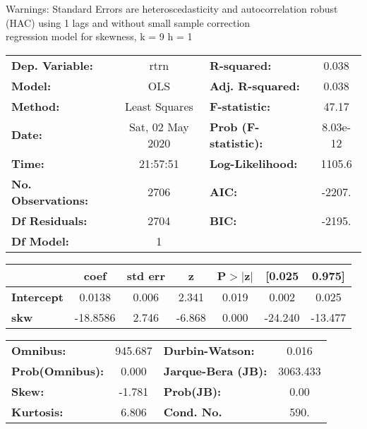 Warnings: \newline
 [1] Standard Errors are heteroscedasticity and autocorrelation robust (HAC) using 1 lags and without small sample correction\\ 

regression model for skewness, k = 9 h = 1\begin{center}
\begin{tabular}{lclc}
\toprule
\textbf{Dep. Variable:}    &       rtrn       & \textbf{  R-squared:         } &     0.038   \\
\textbf{Model:}            &       OLS        & \textbf{  Adj. R-squared:    } &     0.038   \\
\textbf{Method:}           &  Least Squares   & \textbf{  F-statistic:       } &     47.17   \\
\textbf{Date:}             & Sat, 02 May 2020 & \textbf{  Prob (F-statistic):} &  8.03e-12   \\
\textbf{Time:}             &     21:57:51     & \textbf{  Log-Likelihood:    } &    1105.6   \\
\textbf{No. Observations:} &        2706      & \textbf{  AIC:               } &    -2207.   \\
\textbf{Df Residuals:}     &        2704      & \textbf{  BIC:               } &    -2195.   \\
\textbf{Df Model:}         &           1      & \textbf{                     } &             \\
\bottomrule
\end{tabular}
\begin{tabular}{lcccccc}
                   & \textbf{coef} & \textbf{std err} & \textbf{z} & \textbf{P$> |$z$|$} & \textbf{[0.025} & \textbf{0.975]}  \\
\midrule
\textbf{Intercept} &       0.0138  &        0.006     &     2.341  &         0.019        &        0.002    &        0.025     \\
\textbf{skw}       &     -18.8586  &        2.746     &    -6.868  &         0.000        &      -24.240    &      -13.477     \\
\bottomrule
\end{tabular}
\begin{tabular}{lclc}
\textbf{Omnibus:}       & 945.687 & \textbf{  Durbin-Watson:     } &    0.016  \\
\textbf{Prob(Omnibus):} &   0.000 & \textbf{  Jarque-Bera (JB):  } & 3063.433  \\
\textbf{Skew:}          &  -1.781 & \textbf{  Prob(JB):          } &     0.00  \\
\textbf{Kurtosis:}      &   6.806 & \textbf{  Cond. No.          } &     590.  \\
\bottomrule
\end{tabular}
\end{center}

